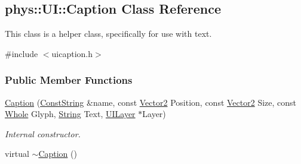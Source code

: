 \hypertarget{classphys_1_1UI_1_1Caption}{
\subsection{phys::UI::Caption Class Reference}
\label{d4/dfe/classphys_1_1UI_1_1Caption}
}


This class is a helper class, specifically for use with text.  




{\ttfamily \#include $<$uicaption.h$>$}

\subsubsection*{Public Member Functions}
\begin{DoxyCompactItemize}
\item 
\hyperlink{classphys_1_1UI_1_1Caption_a8e643db77a6f9b18147cf01cf3bd9238}{Caption} (\hyperlink{namespacephys_a5ce5049f8b4bf88d6413c47b504ebb31}{ConstString} \&name, const \hyperlink{classphys_1_1Vector2}{Vector2} Position, const \hyperlink{classphys_1_1Vector2}{Vector2} Size, const \hyperlink{namespacephys_a460f6bc24c8dd347b05e0366ae34f34a}{Whole} Glyph, \hyperlink{namespacephys_aa03900411993de7fbfec4789bc1d392e}{String} Text, \hyperlink{classphys_1_1UILayer}{UILayer} $\ast$Layer)
\begin{DoxyCompactList}\small\item\em Internal constructor. \item\end{DoxyCompactList}\item 
\hypertarget{classphys_1_1UI_1_1Caption_a5443ce0c7c7dc4b4f1c56b124e092a98}{
virtual \hyperlink{classphys_1_1UI_1_1Caption_a5443ce0c7c7dc4b4f1c56b124e092a98}{$\sim$Caption} ()}
\label{d4/dfe/classphys_1_1UI_1_1Caption_a5443ce0c7c7dc4b4f1c56b124e092a98}


\end{DoxyCompactItemize}
